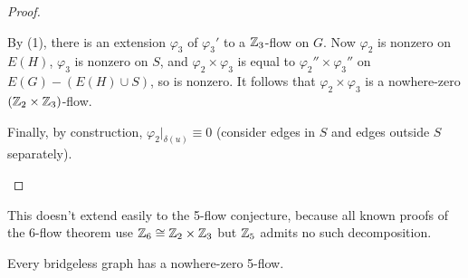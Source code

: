 \documentclass[main.tex]{subfiles}
\begin{document}
\begin{proof}
\begin{itemize}
      By (1), there is an extension $\varphi_3$ of $\varphi_3'$ to a
      $\mathbb Z_3$-flow on $G$.
      Now $\varphi_2$ is nonzero on $E(H)$, $\varphi_3$ is nonzero on $S$,
      and $\varphi_2\times\varphi_3$ is equal to $\varphi_2''\times\varphi_3''$
      on $E(G) - (E(H)\cup S)$, so is nonzero.
      It follows that $\varphi_2\times\varphi_3$ is a nowhere-zero
      $(\mathbb Z_2\times\mathbb Z_3)$-flow.

      Finally, by construction, $\varphi_2|_{\delta(u)}\equiv 0$
      (consider edges in $S$ and edges outside $S$ separately). \qedhere
  \end{itemize}
\end{proof}
This doesn't extend easily to the 5-flow conjecture,
because all known proofs of the 6-flow theorem use $\mathbb Z_6\cong\mathbb Z_2\times\mathbb Z_3$
but $\mathbb Z_5$ admits no such decomposition.
\begin{conjecture}
  Every bridgeless graph has a nowhere-zero 5-flow.
\end{conjecture}
\end{document}
